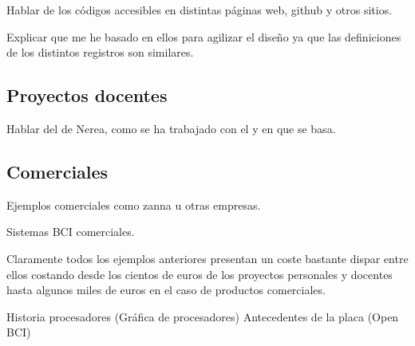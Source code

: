 Hablar de los códigos accesibles en distintas páginas web, github y otros sitios.

Explicar que me he basado en ellos para agilizar el diseño ya que las definiciones de los distintos registros son similares.

\subsection{Proyectos docentes\label{sec:Pro_docentes}}

Hablar del de Nerea, como se ha trabajado con el y en que se basa.

\subsection{Comerciales\label{sec:Pro_empresa}}

Ejemplos comerciales como zanna u otras empresas.

Sistemas BCI comerciales.

Claramente todos los ejemplos anteriores presentan un coste bastante dispar entre ellos costando desde los cientos de euros de los proyectos personales y docentes hasta algunos miles de euros en el caso de productos comerciales.

Historia procesadores (Gráfica de procesadores)
Antecedentes de la placa (Open BCI)